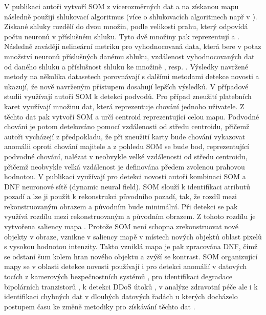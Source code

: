 V publikaci \cite{som6} autoři vytvoří SOM z vícerozměrných dat a na získanou mapu následně použijí shlukovací algoritmus (více o shlukovacích algoritmech např v \cite{klastry}). Získané shluky rozdělí do dvou množin, podle velikosti prahu, který odpovídá počtu neuronů v příslušném shluku. Tyto dvě množiny pak reprezentují  a . Následně zavádějí nelineární metriku pro vyhodnocovaná data, která bere v potaz množství neuronů příslušných danému shluku, vzdálenost vyhodnocovaných dat od daného shluku a příslušnost shluku ke množině , resp. . Výsledky navržené metody na několika datasetech porovnávají s dalšími metodami detekce novosti a ukazují, že nově navrženým přístupem dosahují lepších výsledků. V případové studii \cite{som3} využívají autoři SOM k detekci podvodů. Pro případ zneužití platebních karet využívají množinu dat, která reprezentuje chování jednoho uživatele. Z těchto dat pak vytvoří SOM a určí centroid reprezentující celou mapu. Podvodné chování je potom detekováno pomocí vzdálenosti od středu centroidu, přičemž autoři vycházejí z předpokladu, že při zneužití karty bude chování vykazovat anomálii oproti chování majitele a z pohledu SOM se bude bod, reprezentující podvodné chování, nalézat v neobvykle velké vzdálenosti od středu centroidu, přičemž neobvykle velká vzdálenost je definována předem zvolenou prahovou hodnotou. V publikaci \cite{som1} využívají pro detekci novosti autoři kombinaci SOM a DNF neuronové sítě (dynamic neural field). SOM slouží k identifikaci atributů pozadí a lze ji použít k rekonstrukci původního pozadí, tak, že rozdíl mezi rekonstruovaným obrazem a původním bude minimální. Při detekci se pak využívá rozdílu mezi rekonstruovaným a původním obrazem. Z tohoto rozdílu je vytvořena saliency mapa \cite{sal}. Protože SOM není schopna zrekonstruovat nové objekty v obraze, vznikne v saliency mapě v místech nových objektů oblast pixelů s vysokou hodnotou  intenzity. Takto vzniklá mapa je pak zpracována DNF, čímž se odstaní šum kolem hran nového objektu a zvýší se kontrast. SOM organizující mapy se v oblasti detekce novosti používají i pro detekci anomálií v datových tocích z kamerových bezpečnostních systémů \cite{som2}, pro identifikaci degradace bipolárních tranzistorů \cite{som4}, k detekci DDoS útoků \cite{som7}, v analýze zdravotní péče \cite{som8} ale i k identifikaci chybných dat v dlouhých datových řadách u kterých docházelo postupem času ke změně metodiky pro získávání těchto dat \cite{som5}.
